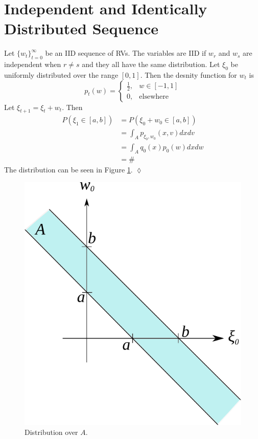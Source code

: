 \documentclass[lecture,12pt,]{pcms-l}
\begin{document}
\section{Independent and Identically Distributed Sequence}
\begin{example}
Let $\lbrace w_t\rbrace_{t=0}^\infty$ be an IID sequence of RVs. The variables are IID if $w_r$ and $w_s$ are independent when $r\neq s$ and they all have the same distribution. Let $\xi_0$ be uniformly distributed over the range $[0,1]$. Then the desnity function for $w_t$ is
$$p_t(w) = \begin{cases} \frac{1}{2}, & w\in[-1,1] \\ 0, & \text{elsewhere} \end{cases}$$
Let $\xi_{t+1}=\xi_t+w_t$. Then
\begin{align*}
P(\xi_1\in[a,b]) &= P(\xi_0 + w_0\in[a,b]) \\
&= \int_A p_{\xi_0,w_0}(x,v)dxdv \\
&= \int_A q_0(x)p_0(w)dxdw \\
&= \#
\end{align*}
The distribution can be seen in Figure \ref{fig:02iid}.
$\lozenge$
\end{example}
\begin{figure}[ht!]
	\centering
	\includegraphics[width=.3\textwidth]{images/02iid}
	\caption{Distribution over $A$.}
	\label{fig:02iid}
\end{figure}
\end{document}
